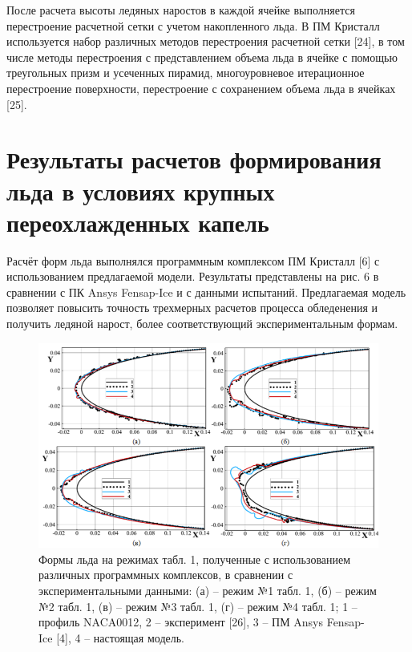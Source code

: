 \documentclass{psta}%
\begin{document}
После расчета высоты ледяных наростов в каждой ячейке выполняется перестроение расчетной сетки с учетом накопленного льда.
В ПМ Кристалл используется набор различных методов перестроения расчетной сетки [24], в том числе методы перестроения с представлением объема льда в ячейке с помощью треугольных призм и усеченных пирамид, многоуровневое итерационное перестроение поверхности, перестроение с сохранением объема льда в ячейках [25].

\section{Результаты расчетов формирования льда в условиях крупных переохлажденных капель}

Расчёт форм льда выполнялся программным комплексом ПМ Кристалл [6] с использованием предлагаемой модели. Результаты представлены на рис. 6 в сравнении с ПК Ansys Fensap-Ice и с данными испытаний.
Предлагаемая модель позволяет повысить точность трехмерных расчетов процесса обледенения и получить ледяной нарост, более соответствующий экспериментальным формам.

\begin{figure}[ht]
\centering
\includegraphics[width=1.0\textwidth]{pics/chart6.png}
\caption{Формы льда на режимах табл. 1, полученные с использованием различных программных комплексов, в сравнении с экспериментальными данными: (а) -- режим №1 табл. 1, (б) -- режим №2 табл. 1, (в) -- режим №3 табл. 1, (г) -- режим №4 табл. 1; 1 -- профиль NACA0012, 2 -- эксперимент [26], 3 -- ПМ Ansys Fensap-Ice [4], 4 -- настоящая модель.}
\label{fig:chart6}
\end{figure}
\end{document}
